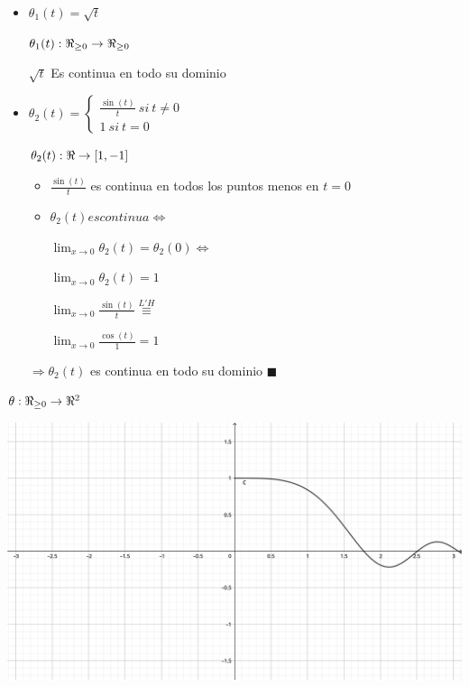 \documentclass[../practica_03.tex]{subfiles}
\begin{document}
\begin{enumerate}
            \begin{itemize}
                \item $\theta_1(t) = \sqrt{t}$
                
                    $\theta_1(t) : \real_{\geq 0} \rightarrow \real_{\geq 0}$

                    $\sqrt{t}$ Es continua en todo su dominio

                \item $\theta_2(t) = \left\{
                        \begin{array}{ll}
                            \frac{\sin(t)}{t}\ si\ t \neq 0\\
                            1                \ si\ t = 0
                        \end{array}
                    \right.$

                    $\theta_2(t): \real \rightarrow [1,-1]$

                    \begin{itemize}
                        \item $\frac{\sin(t)}{t}$ es continua en todos los puntos menos en $t=0$
                        \item $\theta_2(t) es continua \Leftrightarrow$
                        
                            $ \lim_{x\to0} \theta_2(t) = \theta_2(0) \Leftrightarrow$ 

                            $ \lim_{x\to0} \theta_2(t) = 1$ 

                            $ \lim_{x\to0} \frac{\sin(t)}{t} \stackrel{L'H}{\equiv}$ 

                            $ \lim_{x\to0} \frac{\cos(t)}{1} = 1$ 
                    \end{itemize}

                    $\Rightarrow \theta_2(t)$ es continua en todo su dominio $\blacksquare$

            \end{itemize}

            $\theta: \real_{\geq 0} \rightarrow \real^2 $

            \includegraphics[scale=0.8]{ej01/resources/1c.png} $ $

    \end{enumerate}
\end{document}
